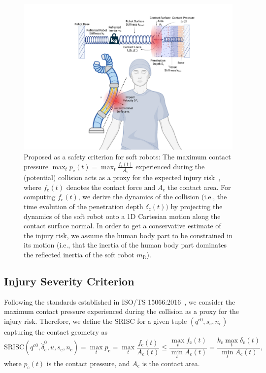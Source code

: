 \begin{figure}[h!]
    \centering
    \includegraphics[width=0.9\linewidth]{safetymetric/figures/injury_severity_criterion.pdf}
    \caption{Proposed  as a safety criterion for soft robots: The maximum contact pressure $\max_t p_\mathrm{c}(t) = \max_t \frac{f_\mathrm{c}(t)}{A_\mathrm{c}}$ experienced during the (potential) collision acts as a proxy for the expected injury risk~\citep{Isots_15066_2016}, where $f_\mathrm{c}(t)$ denotes the contact force and $A_\mathrm{c}$ the contact area. For computing $f_\mathrm{c}(t)$, we derive the dynamics of the collision (i.e., the time evolution of the penetration depth $\delta_\mathrm{c}(t))$ by projecting the dynamics of the soft robot onto a 1D Cartesian motion along the contact surface normal. In order to get a conservative estimate of the injury risk, we assume the human body part to be constrained in its motion (i.e., that the inertia of the human body part dominates the reflected inertia of the soft robot $m_\mathrm{R}$).}
    \label{fig:safetymetric:injury_severity_criterion}
\end{figure}

\subsection{Injury Severity Criterion}
Following the standards established in ISO/TS 15066:2016~\citep{Isots_15066_2016}, we consider the maximum contact pressure experienced during the collision as a proxy for the injury risk. Therefore, we define the \gls{SRISC} for a given tuple $(q^{\mathrm{c}0},s_\mathrm{c}, n_\mathrm{c})$ capturing the contact geometry as
\begin{equation}
    \mathrm{SRISC}(q^{\mathrm{c}0},\dot{\delta}_\mathrm{c}^0,u,s_\mathrm{c},n_\mathrm{c}) = \max_t p_\mathrm{c} = \max_t \frac{f_\mathrm{c}(t)}{A_\mathrm{c}(t)} \leq \frac{\max_t f_\mathrm{c}(t)}{\min_t A_\mathrm{c}(t)} =  \frac{k_\mathrm{c} \max_t \delta_\mathrm{c}(t)}{\min_t A_\mathrm{c}(t)},
\end{equation}
where $p_\mathrm{c}(t)$ is the contact pressure, and $A_\mathrm{c}$ is the contact area.

